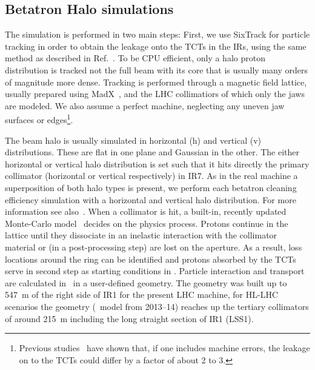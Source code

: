 \subsection{Betatron Halo simulations}
The simulation is performed in two main steps: First, we use SixTrack for particle tracking in order to obtain the leakage onto the TCTs in the IRs, using the same method as described in Ref.~\cite{nimPaperRod}. To be CPU efficient, only a halo proton distribution is tracked not the full beam with its core that is usually many orders of magnitude more dense. Tracking is performed through a magnetic field lattice, usually prepared using MadX~\cite{madx}, and the LHC collimatiors of which only the jaws are modeled. We also assume a perfect machine, neglecting any uneven jaw surfaces or edges\footnote{Previous studies~\cite{roderikSimMeasPaper} have shown that, if one includes machine errors, the leakage on to the TCTs could differ by a factor of about 2 to 3.}.

The beam halo is usually simulated in horizontal (h) and vertical (v) distributions. These are flat in one plane and Gaussian in the other. The either horizontal or vertical halo distribution is set such that it hits directly the primary collimator (horizontal or vertical respectively) in IR7. As in the real machine a superposition of both halo types is present, we perform each betatron cleaning efficiency simulation with a horizontal and vertical halo distribution. For more information see also~\cite{chiarasThesis}. When a collimator is hit, a built-in, recently updated Monte-Carlo model~\cite{claudiasThesis} decides on the physics process. Protons continue in the lattice until they dissociate in an inelastic interaction with the collimator material or (in a post-processing step) are lost on the aperture. As a result, loss locations around the ring can be identified and protons absorbed by the TCTs serve in second step as starting conditions in \fluka. Particle interaction and transport are calculated in \fluka~in a user-defined geometry. The geometry was built up to 547~m of the right side of IR1 for the present LHC machine, for HL-LHC scenarios the geometry (\fluka~model from 2013--14) reaches up the tertiary collimators of around 215~m including the long straight section of IR1 (LSS1).

